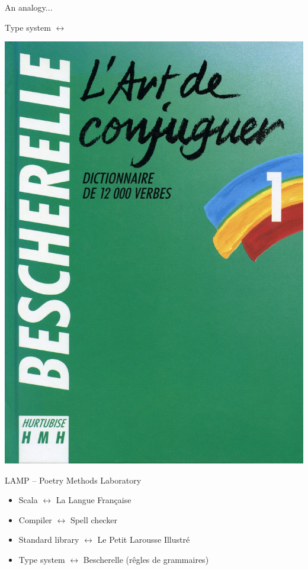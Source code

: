 \documentclass[10pt]{beamer}
\newenvironment{slide}[2][]
  {\begin{frame}[fragile,environment=slide,#1]{#2}}
  {\end{frame}}
\begin{document}
\begin{slide}{An analogy...}
\begin{center}
\begin{minipage}{0.37\textwidth}
\Large
Type system $\longleftrightarrow$
\end{minipage}
\begin{minipage}{0.45\textwidth}
\vspace{10pt}
\includegraphics[width=\textwidth]{figures/bescherelle.jpg}
\end{minipage}
\end{center}
\end{slide}

\begin{slide}{LAMP -- Poetry Methods Laboratory}
\large
\begin{itemize}
  \item Scala $\longleftrightarrow$ La Langue Française
  \item Compiler $\longleftrightarrow$ Spell checker
  \item Standard library $\longleftrightarrow$ Le Petit Larousse Illustré
  \item Type system $\longleftrightarrow$ Bescherelle (rêgles de grammaires)
\end{itemize}
\end{slide}
\end{document}
